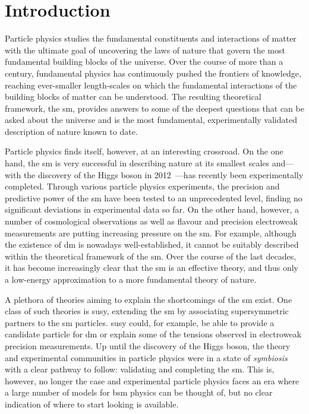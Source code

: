 
\chapter*{Introduction}


Particle physics studies the fundamental constituents and interactions of matter with the ultimate goal of uncovering the laws of nature that govern the most fundamental building blocks of the universe.
Over the course of more than a century, fundamental physics has continuously pushed the frontiers of knowledge, reaching ever-smaller length-scales on which the fundamental interactions of the building blocks of matter can be understood.
The resulting theoretical framework, the \gls{sm}, provides answers to some of the deepest questions that can be asked about the universe and is the most fundamental, experimentally validated description of nature known to date. 

Particle physics finds itself, however, at an interesting crossroad. On the one hand, the \gls{sm} is very successful in describing nature at its smallest scales and---with the discovery of the Higgs boson in 2012~\cite{HIGG-2012-27,CMS-HIG-12-028}---has recently been experimentally completed.
Through various particle physics experiments, the precision and predictive power of the \gls{sm} have been tested to an unprecedented level, finding no significant deviations in experimental data so far.
On the other hand, however, a number of cosmological observations as well as flavour and precision electroweak measurements are putting increasing pressure on the \gls{sm}.
For example, although the existence of \gls{dm} is nowadays well-established, it cannot be suitably described within the theoretical framework of the \gls{sm}.
Over the course of the last decades, it has become increasingly clear that the \gls{sm} is an effective theory, and thus only a low-energy approximation to a more fundamental theory of nature.

A plethora of theories aiming to explain the shortcomings of the \gls{sm} exist. One class of such theories is \gls{susy}, extending the \gls{sm} by associating supersymmetric partners to the \gls{sm} particles.
\gls{susy} could, for example, be able to provide a candidate particle for \gls{dm} or explain some of the tensions observed in electroweak precision measurements.
Up until the discovery of the Higgs boson, the theory and experimental communities in particle physics were in a state of \textit{symbiosis} with a clear pathway to follow: validating and completing the \gls{sm}. This is, however, no longer the case and experimental particle physics faces an era where a large number of models for \gls{bsm} physics can be thought of, but no clear indication of where to start looking is available. 

